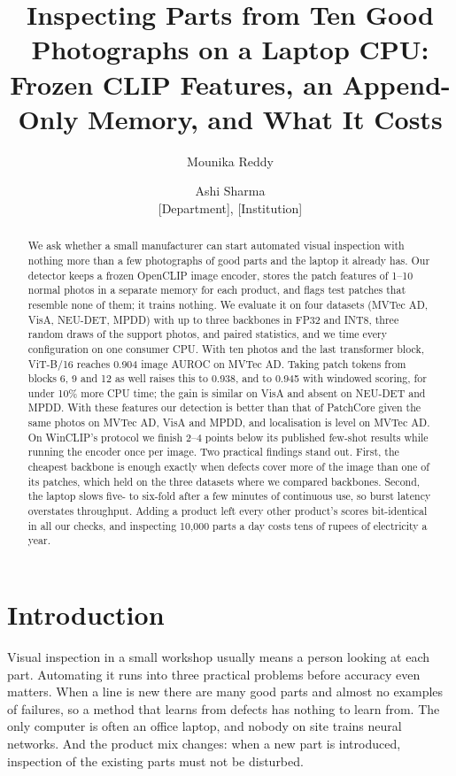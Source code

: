 \documentclass[10pt,twocolumn]{article}
\title{Inspecting Parts from Ten Good Photographs on a Laptop CPU:\\
Frozen CLIP Features, an Append-Only Memory, and What It Costs}
\author{Mounika Reddy \and Ashi Sharma\\[2pt]
\normalsize [Department], [Institution]}
\date{}
\begin{document}
\maketitle

\begin{abstract}
We ask whether a small manufacturer can start automated visual inspection with
nothing more than a few photographs of good parts and the laptop it already has.
Our detector keeps a frozen OpenCLIP image encoder, stores the patch features of
1--10 normal photos in a separate memory for each product, and flags test patches
that resemble none of them; it trains nothing. We evaluate it on four datasets
(MVTec AD, VisA, NEU-DET, MPDD) with up to three backbones in FP32 and INT8, three
random draws of the support photos, and paired statistics, and we time every configuration on one
consumer CPU. With ten photos and the last transformer block, ViT-B/16 reaches
0.904 image AUROC on MVTec AD. Taking patch tokens from blocks 6, 9 and 12 as well
raises this to 0.938, and to 0.945 with windowed scoring, for under 10\% more
CPU time; the gain is similar on VisA and absent on NEU-DET and MPDD. With these
features our detection is better than that of PatchCore given the same photos on
MVTec AD, VisA and MPDD, and localisation is level on MVTec AD. On WinCLIP's
protocol we finish 2--4 points below its published few-shot results while running
the encoder once per image. Two practical findings stand out. First, the cheapest
backbone is enough exactly when defects cover more of the image than one of its
patches, which held on the three datasets where we compared backbones. Second, the laptop slows five- to
six-fold after a few minutes of continuous use, so burst latency overstates
throughput. Adding a product left every other product's scores bit-identical in
all our checks, and inspecting 10,000 parts a day costs tens of rupees of
electricity a year.
\end{abstract}

\section{Introduction}

Visual inspection in a small workshop usually means a person looking at each
part. Automating it runs into three practical problems before accuracy even
matters. When a line is new there are many good parts and almost no examples of
failures, so a method that learns from defects has nothing to learn from. The
only computer is often an office laptop, and nobody on site trains neural
networks. And the product mix changes: when a new part is introduced, inspection
of the existing parts must not be disturbed.
\end{document}
